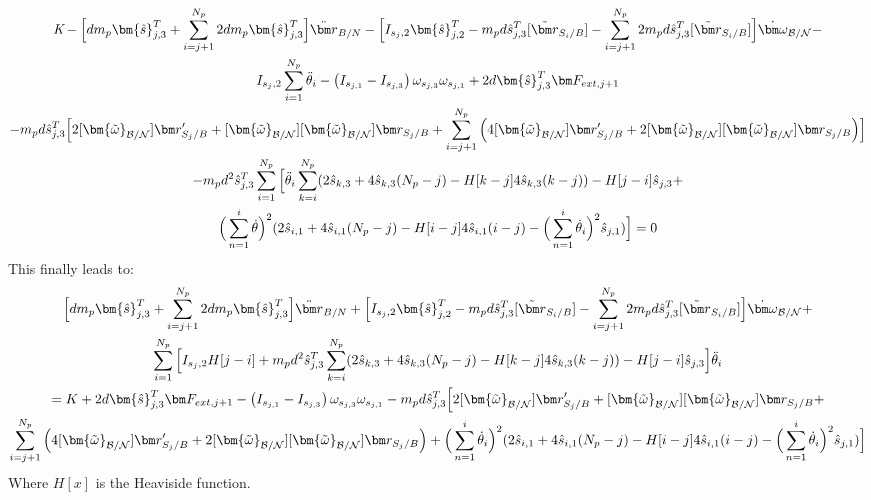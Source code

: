 \documentclass[paper]{aiaaNew}
\begin{document}
\begin{multline}
\textit{K} - \Big[d m_p\bm{\hat{s}}^{T}_{j,3}+\sum^{N_p}_{i=j+1}2 d m_p\bm{\hat{s}}^{T}_{j,3}\Big]\ddot{\bm r}_{B/N} - \Big[I_{s_j,2} \bm{\hat{s}}_{j,2}^T -m_p d \hat{s}^{T}_{j,3}[\tilde{{\bm r}}_{S_{i}/B}]-\sum^{N_p}_{i=j+1} 2 m_p d \hat{s}^{T}_{j,3}[\tilde{{\bm r}}_{S_{i}/B}]\Big]\dot{\bm\omega}_{\cal B/N} - \\
I_{s_j,2} \sum^{N_p}_{i=1}\ddot{\theta}_i - \left( I_{s_{j,1}} - I_{s_{j,3}}\right) \omega_{s_{j,3}} \omega_{s_{j,1}}+ 2d\bm{\hat{s}}^{T}_{j,3}\bm F_{ext,j+1}\\
-m_p d \hat{s}^{T}_{j,3}\Big[2[\bm{\tilde{\omega}}_{\cal B/N}]\bm r'_{S_{j}/B} + [\bm{\tilde{\omega}}_{\cal B/N}][\bm{\tilde{\omega}}_{\cal B/N}]\bm r_{S_{j}/B}+\sum^{N_p}_{i=j+1}\Big(4[\bm{\tilde{\omega}}_{\cal B/N}]\bm r'_{S_{j}/B} + 2[\bm{\tilde{\omega}}_{\cal B/N}][\bm{\tilde{\omega}}_{\cal B/N}]\bm r_{S_{j}/B} \Big)\Big]\\
-m_p d^2 \hat{s}^{T}_{j,3}\sum^{N_p}_{i=1}\Big[\ddot{\theta}_i \sum^{N_p}_{k=i}(2\hat{s}_{k,3}+4\hat{s}_{k,3}(N_p-j) -H[k-j] 4\hat{s}_{k,3}(k-j)) - H[j-i]\hat{s}_{j,3} + \\
\Big( \sum^{i}_{n=1} \dot{\theta}\Big)^2 (2\hat{s}_{i,1}+4\hat{s}_{i,1}(N_p-j) -H[i-j] 4\hat{s}_{i,1}(i-j) - \Big( \sum^{i}_{n=1} \dot{\theta}_i\Big)^2 \hat{s}_{j,1} ) \Big] = 0 
\end{multline}
This finally leads to:
\begin{multline}
\Big[d m_p\bm{\hat{s}}^{T}_{j,3}+\sum^{N_p}_{i=j+1}2 d m_p\bm{\hat{s}}^{T}_{j,3}\Big]\ddot{\bm r}_{B/N} + \Big[I_{s_j,2} \bm{\hat{s}}_{j,2}^T -m_p d \hat{s}^{T}_{j,3}[\tilde{{\bm r}}_{S_{i}/B}]-\sum^{N_p}_{i=j+1} 2 m_p d \hat{s}^{T}_{j,3}[\tilde{{\bm r}}_{S_{i}/B}]\Big]\dot{\bm\omega}_{\cal B/N} +\\
\sum^{N_p}_{i=1}\Big[I_{s_j,2} H[j-i] + m_p d^2 \hat{s}^{T}_{j,3} \sum^{N_p}_{k=i}(2\hat{s}_{k,3}+4\hat{s}_{k,3}(N_p-j) -H[k-j] 4\hat{s}_{k,3}(k-j)) - H[j-i]\hat{s}_{j,3} \Big] \ddot{\theta}_i\\
= K + 2d\bm{\hat{s}}^{T}_{j,3}\bm F_{ext,j+1} - \left( I_{s_{j,1}} - I_{s_{j,3}}\right) \omega_{s_{j,3}} \omega_{s_{j,1}} - m_p d \hat{s}^{T}_{j,3}\Big[2[\bm{\tilde{\omega}}_{\cal B/N}]\bm r'_{S_{j}/B} + [\bm{\tilde{\omega}}_{\cal B/N}][\bm{\tilde{\omega}}_{\cal B/N}]\bm r_{S_{j}/B}+\\
\sum^{N_p}_{i=j+1}\Big(4[\bm{\tilde{\omega}}_{\cal B/N}]\bm r'_{S_{j}/B} + 2[\bm{\tilde{\omega}}_{\cal B/N}][\bm{\tilde{\omega}}_{\cal B/N}]\bm r_{S_{j}/B} \Big) + \Big( \sum^{i}_{n=1} \dot{\theta}_i \Big)^2 (2\hat{s}_{i,1}+4\hat{s}_{i,1}(N_p-j) -H[i-j] 4\hat{s}_{i,1}(i-j) - \Big( \sum^{i}_{n=1} \dot{\theta}_i\Big)^2 \hat{s}_{j,1} )\Big]
\label{eq:flexr}
\end{multline}
Where $H[x]$ is the Heaviside function.
\end{document}
